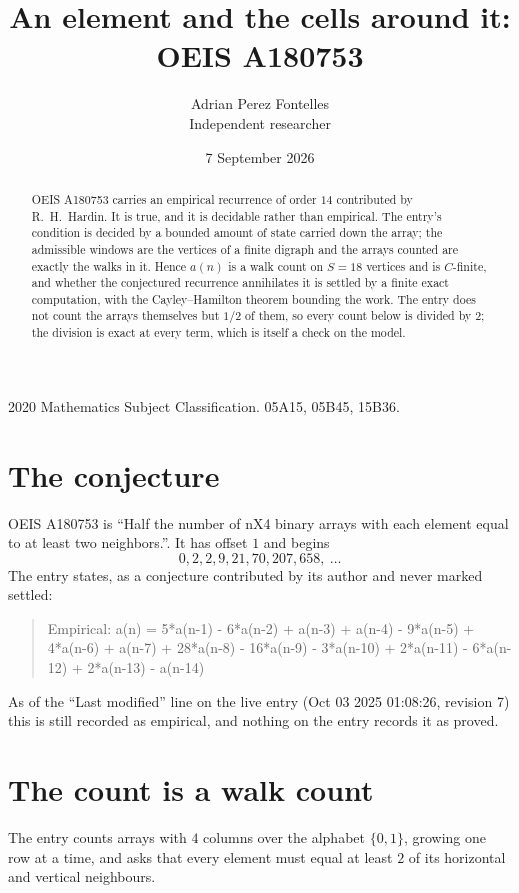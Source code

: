 \documentclass[11pt,a4paper]{article}
\title{An element and the cells around it: OEIS A180753}
\author{Adrian Perez Fontelles\\ \small Independent researcher}
\date{7 September 2026}
\theoremstyle{plain}
\theoremstyle{definition}
\begin{document}
\maketitle

\begin{abstract}
OEIS A180753 carries an empirical recurrence of order $14$ contributed by R.~H.~Hardin. It is
true, and it is decidable rather than empirical. The entry's condition is decided by a bounded amount of state carried down the array; the
admissible windows are the vertices of a finite digraph and the arrays counted are exactly the
walks in it. Hence $a(n)$ is a walk count on $S=18$ vertices and is $C$-finite, and whether the
conjectured recurrence annihilates it is settled by a finite exact computation, with the
Cayley--Hamilton theorem bounding the work. The entry does not count the arrays themselves but $1/2$ of them, so every count below is divided by $2$; the division is exact at every term, which is itself a check on the model.
\end{abstract}

\noindent\small 2020 Mathematics Subject Classification. 05A15, 05B45, 15B36.\normalsize

\section{The conjecture}

OEIS A180753 is ``Half the number of nX4 binary arrays with each element equal to at least two neighbors.''. It has offset $1$ and begins
\[
0, 2, 2, 9, 21, 70, 207, 658,\ \dots
\]
The entry states, as a conjecture contributed by its author and never marked settled:
\begin{quote}
Empirical: a(n) = 5*a(n-1) - 6*a(n-2) + a(n-3) + a(n-4) - 9*a(n-5) + 4*a(n-6) + a(n-7) + 28*a(n-8) - 16*a(n-9) - 3*a(n-10) + 2*a(n-11) - 6*a(n-12) + 2*a(n-13) - a(n-14)
\end{quote}
As of the ``Last modified'' line on the live entry (Oct 03 2025 01:08:26, revision 7) this is still
recorded as empirical, and nothing on the entry records it as proved.

\section{The count is a walk count}

The entry counts arrays with $4$ columns over the alphabet $\{0,1\}$, growing one row at a time, and asks that every element must equal at least $2$ of its horizontal and vertical neighbours.
\end{document}
